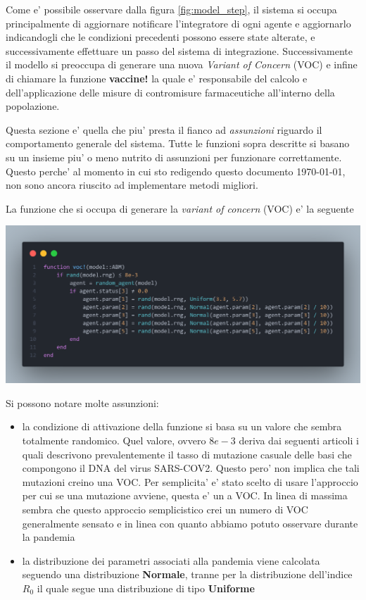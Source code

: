 Come e' possibile osservare dalla figura \ref{fig:model_step}, il sistema si occupa principalmente
di aggiornare notificare l'integratore di ogni agente e aggiornarlo indicandogli che le condizioni
precedenti possono essere state alterate, e successivamente effettuare un passo del sistema di 
integrazione. Successivamente il modello si preoccupa di generare una nuova \emph{Variant of Concern} (VOC)
e infine di chiamare la funzione \textbf{vaccine!} la quale e' responsabile del calcolo e dell'applicazione 
delle misure di contromisure farmaceutiche all'interno della popolazione. 

Questa sezione e' quella che piu' presta il fianco ad \emph{assunzioni} riguardo 
il comportamento generale del sistema. Tutte le funzioni sopra descritte si basano su un insieme
piu' o meno nutrito di assunzioni per funzionare correttamente. Questo perche' al momento in cui sto 
redigendo questo documento \today, non sono ancora riuscito ad implementare metodi migliori. 

La funzione che si occupa di generare la \emph{variant of concern} (VOC) e' la seguente

\begin{minipage}{\linewidth}
	\centering
	\includegraphics[width=\textwidth]{img/voc.png}
	\label{fig:voc}
\end{minipage}

Si possono notare molte assunzioni:
\begin{itemize}
	\item la condizione di attivazione della funzione si basa su un valore
	che sembra totalmente randomico. Quel valore, ovvero $8e-3$ deriva dai
	seguenti articoli \cite{Markov2023} \cite{https://doi.org/10.1002/jmv.27331} \cite{Abavisani2022}
	i quali descrivono prevalentemente il tasso di mutazione casuale delle basi che compongono
	il DNA del virus SARS-COV2. Questo pero' non implica che tali mutazioni 
	creino una VOC. Per semplicita' e' stato scelto di usare l'approccio per cui
	se una mutazione avviene, questa e' un a VOC. In linea di massima sembra che 
	questo approccio semplicistico crei un numero di VOC generalmente sensato e 
	in linea con quanto abbiamo potuto osservare durante la pandemia
	\item la distribuzione dei parametri associati alla pandemia viene calcolata
	seguendo una distribuzione \textbf{Normale}, tranne per la distribuzione dell'indice $R_0$
	il quale segue una distribuzione di tipo \textbf{Uniforme} \cite{wiki:Numero_di_riproduzione_di_base}
\end{itemize}

